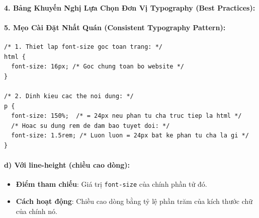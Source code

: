 \documentclass[11pt,oneside]{book}
\newcommand{\thd}[1]{\textcolor{white}{\textbf{\strut #1}}}
\newcommand{\codeinline}[1]{\textcolor{accentOrange}{\texttt{#1}}}
\begin{document}
\paragraph{4. Bảng Khuyến Nghị Lựa Chọn Đơn Vị Typography (Best Practices):}

\begin{prettyTableBox}
\sffamily\small
{}
\end{prettyTableBox}

\paragraph{5. Mẹo Cài Đặt Nhất Quán (Consistent Typography Pattern):}

\begin{codeWindow}
\begin{lstlisting}[language=CSS3]
/* 1. Thiet lap font-size goc toan trang: */
html {
  font-size: 16px; /* Goc chung toan bo website */
}

/* 2. Dinh kieu cac the noi dung: */
p {
  font-size: 150%;  /* = 24px neu phan tu cha truc tiep la html */
  /* Hoac su dung rem de dam bao tuyet doi: */
  font-size: 1.5rem; /* Luon luon = 24px bat ke phan tu cha la gi */
}
\end{lstlisting}
\end{codeWindow}

\paragraph{d) Với line-height (chiều cao dòng):}
\begin{itemize}[leftmargin=1.5em, itemsep=2pt, parsep=0pt]
    \item \textbf{Điểm tham chiếu}: Giá trị \codeinline{font-size} của chính phần tử đó.
    \item \textbf{Cách hoạt động}: Chiều cao dòng bằng tỷ lệ phần trăm của kích thước chữ của chính nó.
\end{itemize}
\end{document}
